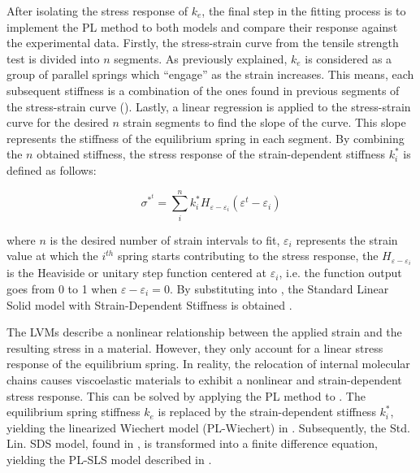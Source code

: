 After isolating the stress response of $k_e$, the final step in the fitting process is to implement the PL method to both models and compare their response against the experimental data. Firstly, the stress-strain curve from the tensile strength test is divided into $n$ segments. As previously explained, $k_e$ is considered as a group of parallel springs which ``engage'' as the strain increases. This means, each subsequent stiffness is a combination of the ones found in previous segments of the stress-strain curve ().  Lastly, a linear regression is applied to the stress-strain curve for the desired $n$ strain segments to find the slope of the curve. This slope represents the stiffness of the equilibrium spring in each segment. By combining the $n$ obtained stiffness, the stress response of the strain-dependent stiffness $k_i^*$ is defined as follows:

\begin{equation}
\label{eq5}
\sigma^{*^t} = \sum_i^n k_i^* H_{\varepsilon - \varepsilon_i}(\varepsilon^t - \varepsilon_i)
\end{equation}

\noindent where $n$ is the desired number of strain intervals to fit, $\varepsilon_i$ represents the strain value at which the $i^{th}$ spring starts contributing to the stress response, the $H_{\varepsilon - \varepsilon_i}$ is the Heaviside or unitary step function centered at $\varepsilon_i$, i.e. the function output goes from 0 to 1 when $\varepsilon - \varepsilon_i = 0$. By substituting  into , the Standard Linear Solid model with Strain-Dependent Stiffness is obtained \cite{austin2015control}.

The LVMs describe a nonlinear relationship between the applied strain and the resulting stress in a material. However, they only account for a linear stress response of the equilibrium spring. In reality, the relocation of internal molecular chains causes viscoelastic materials to exhibit a nonlinear and strain-dependent stress response. This can be solved by applying the PL method to . The equilibrium spring stiffness $k_e$ is replaced by the strain-dependent stiffness $k_i^*$, yielding the linearized Wiechert model (PL-Wiechert) in . Subsequently, the Std. Lin. SDS model, found in \cite{austin2015control}, is transformed into a finite difference equation, yielding the PL-SLS model described in .

